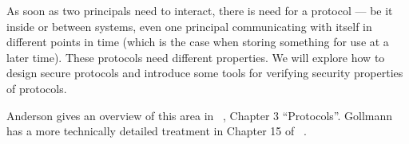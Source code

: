 As soon as two principals need to interact, there is need for a protocol --- be 
it inside or between systems, even one principal communicating with itself in 
different points in time (which is the case when storing something for use at a 
later time).
These protocols need different properties.
We will explore how to design secure protocols and introduce some tools for 
verifying security properties of protocols.

Anderson gives an overview of this area in 
~\cite{Anderson2008sea}, Chapter 
3 \enquote{Protocols}.
Gollmann has a more technically detailed treatment in Chapter 15 of 
~\cite{Gollmann2011cs}.
